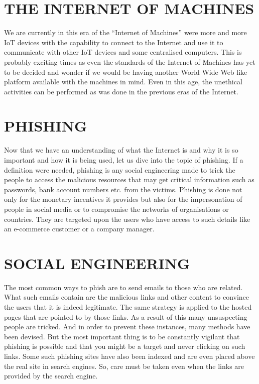 \section{THE INTERNET OF MACHINES}
We are currently in this era of the “Internet of Machines” were more and more IoT devices with the capability to connect to the Internet and use it to communicate with other IoT devices and some centralised computers. This is probably exciting times as even the standards of the Internet of Machines has yet to be decided and wonder if we would be having another World Wide Web like platform available with the machines in mind. Even in this age, the unethical activities can be performed as was done in the previous eras of the Internet.

\section{PHISHING}
Now that we have an understanding of what the Internet is and why it is so important and how it is being used, let us dive into the topic of phishing. If a definition were needed, phishing is any social engineering made to trick the people to access the malicious resources that may get critical information such as passwords, bank account numbers etc. from the victims. Phishing is done not only for the monetary incentives it provides but also for the impersonation of people in social media or to compromise the networks of organisations or countries. They are targeted upon the users who have access to such details like an e-commerce customer or a company manager. 

\section{SOCIAL ENGINEERING}
The most common ways to phish are to send emails to those who are related. What such emails contain are the malicious links and other content to convince the users that it is indeed legitimate. The same strategy is applied to the hosted pages that are pointed to by those links. As a result of this many unsuspecting people are tricked. And in order to prevent these instances, many methods have been devised. But the most important thing is to be constantly vigilant that phishing is possible and that you might be a target and never clicking on such links. Some such phishing sites have also been indexed and are even placed above the real site in search engines. So, care must be taken even when the links are provided by the search engine.

